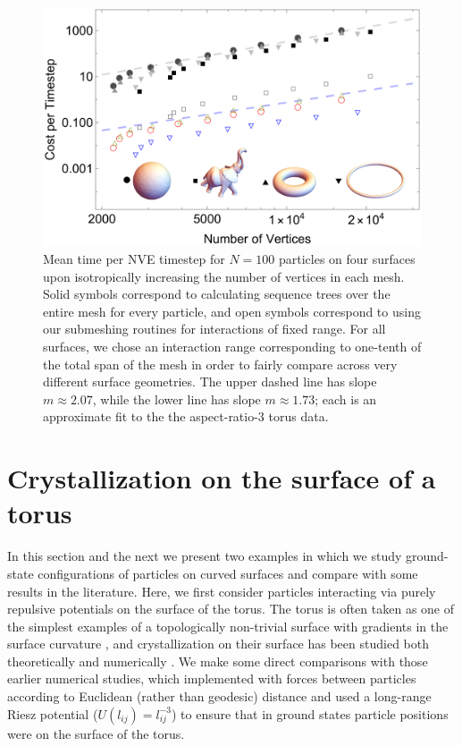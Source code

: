\documentclass[preprint,12pt]{elsarticle}
\begin{document}
\begin{figure}[hbt]
\centering
\includegraphics[width=\columnwidth]{cvc_final_spread_meshes.png}
\caption{Mean time per NVE timestep for $N=100$ particles on four surfaces upon isotropically increasing the number of vertices in each mesh. Solid symbols correspond to calculating sequence trees over the entire mesh for every particle, and open symbols correspond to using our submeshing routines for interactions of fixed range. For all surfaces, we chose an interaction range corresponding to one-tenth of the total span of the mesh in order to fairly compare across very different surface geometries.
The upper dashed line has slope $m\approx 2.07$, while the lower line has slope $m\approx 1.73$; each is an approximate fit to the the aspect-ratio-3 torus data.}
\label{fig:computationalComplexityFixedParticleNumber}
\end{figure}


\section{Crystallization on the surface of a torus}\label{sec:example}

In this section and the next we present two examples in which we study ground-state configurations of particles on curved surfaces and compare with some results in the literature. Here, we first consider particles interacting via purely repulsive potentials on the surface of the torus.
The torus is often taken as one of the simplest examples of a topologically non-trivial surface with gradients in the surface curvature \cite{bowick2009two}, and crystallization on their surface has been studied both theoretically and numerically \cite{giomi2008elastic,giomi2008defective}. We make some direct comparisons with those earlier numerical studies, which implemented with forces between particles according to Euclidean (rather than geodesic) distance and used a long-range Riesz potential ($U(l_{ij}) = l_{ij}^{-3}$) to ensure that in ground states particle positions were on the surface of the torus.
\end{document}
